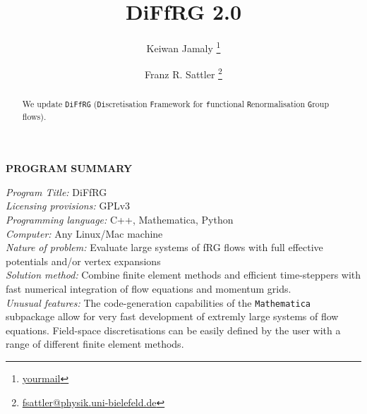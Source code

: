 \documentclass[preprint,10pt,sort&compress]{elsarticle}
\newcommand{\gettitle}{DiFfRG 2.0}
\begin{document}
\renewcommand{\thefootnote}{\fnsymbol{footnote}}
\begin{frontmatter}

	\title{\gettitle}
	
	\author[a]{Keiwan Jamaly
		\footnote{\url{yourmail}}}

	\author[c]{Franz R. Sattler 
		\footnote{\url{fsattler@physik.uni-bielefeld.de}}}


	\address[a]{Institut f\"ur Theoretische
		Physik, Universit\"at Heidelberg, Philosophenweg 16, 69120 Heidelberg,
		Germany}
	\address[b]{ExtreMe Matter Institute EMMI, GSI, Planckstr. 1, 64291 Darmstadt, Germany}
	\address[c]{Institut f\"ur Physik, Universit\"at Bielefeld...}

	\begin{abstract}

		We update \texttt{DiFfRG} (\texttt{Di}scretisation \texttt{F}ramework for \texttt{f}unctional \texttt{R}enormalisation \texttt{G}roup flows).

	\end{abstract}

\end{frontmatter}
\renewcommand{\thefootnote}{\arabic{footnote}}

\vspace{0.25cm}
{\bf PROGRAM SUMMARY}\\\vspace{-0.2cm}

\begin{small}
	\noindent
	{\em Program Title:}  DiFfRG \\
	{\em Licensing provisions:} GPLv3                                   \\
	{\em Programming language:} C++, Mathematica, Python                                  \\
	{\em Computer:}  Any Linux/Mac machine                           \\
	{\em Nature of problem:}  Evaluate large systems of fRG flows with full effective potentials and/or vertex expansions\\
	{\em Solution method:} Combine finite element methods and efficient time-steppers with fast numerical integration of flow equations and momentum grids. \\
	{\em Unusual features:} The code-generation capabilities of the \texttt{Mathematica} subpackage allow for very fast development of extremly large systems of flow equations. Field-space discretisations can be easily defined by the user with a range of different finite element methods.\\
\end{small}
\end{document}
